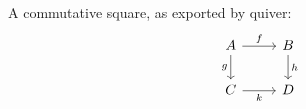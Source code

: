 \documentclass{article}
\begin{document}
A commutative square, as exported by quiver:
\[\begin{tikzcd}[ampersand replacement=\&]
	A \& B \\
	C \& D
	\arrow["f", from=1-1, to=1-2]
	\arrow["g"', from=1-1, to=2-1]
	\arrow["h", from=1-2, to=2-2]
	\arrow["k"', from=2-1, to=2-2]
\end{tikzcd}\]
\end{document}
